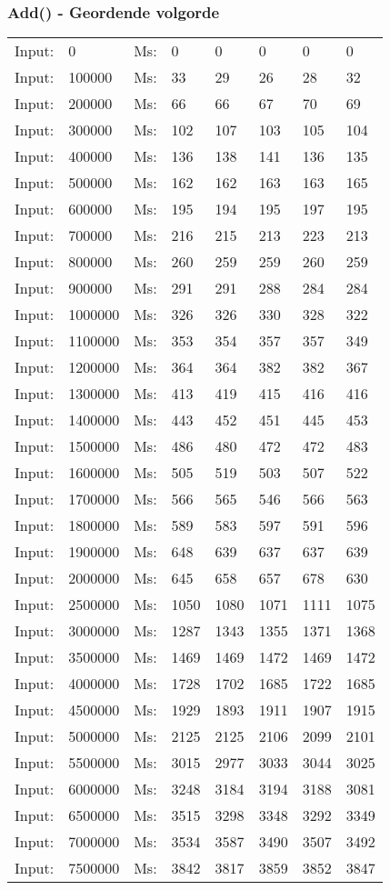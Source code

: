 \documentclass[11pt,a4paper]{report}
\begin{document}
\begin{tiny}
\subsubsection*{Add() - Geordende volgorde}
\begin{tabular}{l l ||l  l  l  l  l  l}
Input:&0&Ms:&0&0&0&0&0\\
Input:&100000&Ms:&33&29&26&28&32\\
Input:&200000&Ms:&66&66&67&70&69\\
Input:&300000&Ms:&102&107&103&105&104\\
Input:&400000&Ms:&136&138&141&136&135\\
Input:&500000&Ms:&162&162&163&163&165\\
Input:&600000&Ms:&195&194&195&197&195\\
Input:&700000&Ms:&216&215&213&223&213\\
Input:&800000&Ms:&260&259&259&260&259\\
Input:&900000&Ms:&291&291&288&284&284\\
Input:&1000000&Ms:&326&326&330&328&322\\
Input:&1100000&Ms:&353&354&357&357&349\\
Input:&1200000&Ms:&364&364&382&382&367\\
Input:&1300000&Ms:&413&419&415&416&416\\
Input:&1400000&Ms:&443&452&451&445&453\\
Input:&1500000&Ms:&486&480&472&472&483\\
Input:&1600000&Ms:&505&519&503&507&522\\
Input:&1700000&Ms:&566&565&546&566&563\\
Input:&1800000&Ms:&589&583&597&591&596\\
Input:&1900000&Ms:&648&639&637&637&639\\
Input:&2000000&Ms:&645&658&657&678&630\\
Input:&2500000&Ms:&1050&1080&1071&1111&1075\\
Input:&3000000&Ms:&1287&1343&1355&1371&1368\\
Input:&3500000&Ms:&1469&1469&1472&1469&1472\\
Input:&4000000&Ms:&1728&1702&1685&1722&1685\\
Input:&4500000&Ms:&1929&1893&1911&1907&1915\\
Input:&5000000&Ms:&2125&2125&2106&2099&2101\\
Input:&5500000&Ms:&3015&2977&3033&3044&3025\\
Input:&6000000&Ms:&3248&3184&3194&3188&3081\\
Input:&6500000&Ms:&3515&3298&3348&3292&3349\\
Input:&7000000&Ms:&3534&3587&3490&3507&3492\\
Input:&7500000&Ms:&3842&3817&3859&3852&3847\\
\end{tabular}
\\

\end{tiny}
\end{document}
